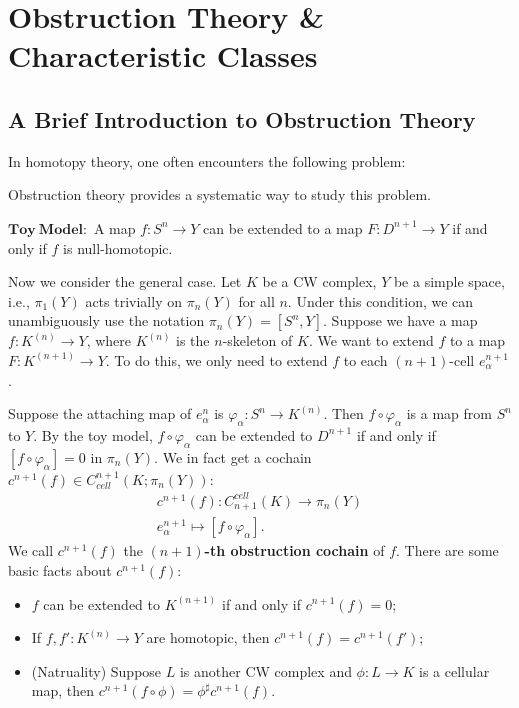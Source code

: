 \section{Obstruction Theory \& Characteristic Classes}
\label{sec:ObstructionTheory&CharacteristicClasses}
\subsection{A Brief Introduction to Obstruction Theory}
In homotopy theory, one often encounters the following problem: 
\begin{center}
\end{center}
Obstruction theory provides a systematic way to study 
this problem. 

$\mathbf{Toy\ Model:}$ A map $f:S^n\to Y$ can be extended to a map 
$F:D^{n+1}\to Y$ if and only if $f$ is null-homotopic.

Now we consider the general case. Let $K$ be a CW complex, $Y$ be a simple 
space, i.e., $\pi_1(Y)$ acts trivially on $\pi_n(Y)$ for all $n$. Under this 
condition, we can unambiguously use the notation $\pi_n(Y) = [S^n, Y]$.  
Suppose we have a map $f:K^{(n)}\to Y$, where $K^{(n)}$ is the 
$n$-skeleton of $K$. We want to extend $f$ to a map $F:K^{(n+1)}\to Y$. 
To do this, we only need to extend $f$ to each $(n+1)$-cell $e_\alpha^{n+1}$. 

Suppose the attaching map of $e_\alpha^n$ is 
$\varphi_\alpha:S^{n}\to K^{(n)}.$ Then $f\circ \varphi_\alpha$ is a map
from $S^{n}$ to $Y$. By the toy model, $f\circ \varphi_\alpha$ can be
extended to $D^{n+1}$ if and only if $[f\circ \varphi_\alpha] = 0$ in
$\pi_{n}(Y)$. We in fact get a cochain 
$c^{n+1}(f)\in C^{n+1}_{cell}(K;\pi_{n}(Y))$: 
\begin{align*}
    c^{n+1}(f):C_{n+1}^{cell}(K)\to \pi_{n}(Y) \\
    e_\alpha^{n+1}\mapsto [f\circ \varphi_\alpha].
\end{align*}
We call $c^{n+1}(f)$ the \textbf{${(n+1)}$-th obstruction cochain} of $f$. 
There are some basic facts about $c^{n+1}(f)$: 
\begin{itemize}
    \item $f$ can be extended to $K^{(n+1)}$ if and only if $c^{n+1}(f) = 0$; 
    \item If $f,f':K^{(n)}\to Y$ are homotopic, then 
    $c^{n+1}(f) = c^{n+1}(f')$; 
    \item (Natruality) Suppose $L$ is another CW complex and $\phi:L\to K$ 
    is a cellular map, then $c^{n+1}(f\circ \phi) = \phi^{\sharp}c^{n+1}(f)$.
\end{itemize}

